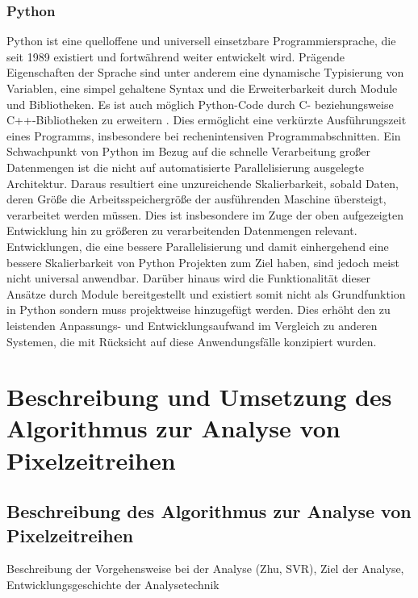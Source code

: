 
\subsection{Python}
Python ist eine quelloffene und universell einsetzbare Programmiersprache, die seit 1989 existiert und fortwährend weiter entwickelt wird. Prägende Eigenschaften der Sprache sind unter anderem eine dynamische Typisierung von Variablen, eine simpel gehaltene Syntax und die Erweiterbarkeit durch Module und Bibliotheken. Es ist auch möglich Python-Code durch C- beziehungsweise C++-Bibliotheken zu erweitern \cite{Martelli2006}. Dies ermöglicht eine verkürzte Ausführungszeit eines Programms, insbesondere bei rechenintensiven Programmabschnitten. Ein Schwachpunkt von Python im Bezug auf die schnelle Verarbeitung großer Datenmengen ist die nicht auf automatisierte Parallelisierung ausgelegte Architektur. Daraus resultiert eine unzureichende Skalierbarkeit, sobald Daten, deren Größe die Arbeitsspeichergröße der ausführenden Maschine übersteigt, verarbeitet werden müssen. Dies ist insbesondere im Zuge der oben aufgezeigten Entwicklung hin zu größeren zu verarbeitenden Datenmengen relevant. Entwicklungen, die eine bessere Parallelisierung und damit einhergehend eine bessere Skalierbarkeit von Python Projekten zum Ziel haben, sind jedoch meist nicht universal anwendbar. Darüber hinaus wird die Funktionalität dieser Ansätze durch Module bereitgestellt und existiert somit nicht als Grundfunktion in Python sondern muss projektweise hinzugefügt werden. Dies erhöht den zu leistenden Anpassungs- und Entwicklungsaufwand im Vergleich zu anderen Systemen, die mit Rücksicht auf diese Anwendungsfälle konzipiert wurden.

\chapter[Algorithmus zur Analyse von Pixelzeitreihen]{Beschreibung und Umsetzung des Algorithmus zur Analyse von Pixelzeitreihen}
\section[Beschreibung des Algorithmus]{Beschreibung des Algorithmus zur Analyse von Pixelzeitreihen}
Beschreibung der Vorgehensweise bei der Analyse (Zhu, SVR), Ziel der Analyse, Entwicklungsgeschichte der Analysetechnik
